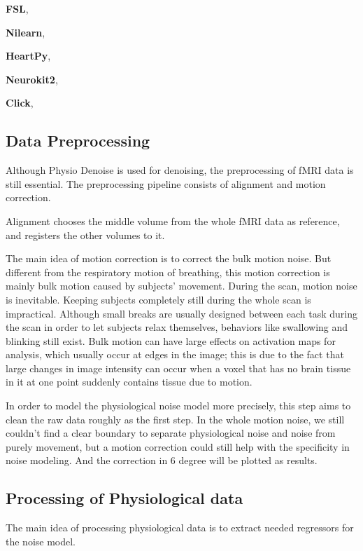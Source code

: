 \textbf{FSL},

\textbf{Nilearn},


\textbf{HeartPy}\cite{van2019heartpy},

\textbf{Neurokit2}\cite{Makowski2021neurokit},

\textbf{Click},


\subsection{Data Preprocessing}

Although Physio Denoise is used for denoising, the preprocessing of fMRI data is still essential.
The preprocessing pipeline consists of alignment and motion correction.

Alignment chooses the middle volume from the whole fMRI data as reference, and registers the other
volumes to it. 

The main idea of motion correction is to correct the bulk motion noise. 
But different from the respiratory motion of breathing, this motion correction
is mainly bulk motion caused by subjects' movement. During the scan, motion noise is inevitable. 
Keeping subjects completely still during the whole scan is impractical.
Although small breaks are usually designed between each task during the scan in order to let subjects relax themselves, 
behaviors like swallowing and blinking still exist.
Bulk motion can have large effects on activation maps for analysis, 
which usually occur at edges in the image; 
this is due to the fact that large changes in image intensity can occur 
when a voxel that has no brain tissue in it at one point 
suddenly contains tissue due to motion. \cite{poldrack2011handbook}



In order to model the physiological noise model more precisely, 
this step aims to clean the raw data roughly as the first step.
In the whole motion noise, we still couldn't find a clear boundary
to separate physiological noise and noise from purely movement, but a motion correction could
still help with the specificity in noise modeling. And the correction in 6 degree will be plotted 
as results.

\subsection{Processing of Physiological data}
The main idea of processing physiological data is to extract needed regressors for the noise model.

